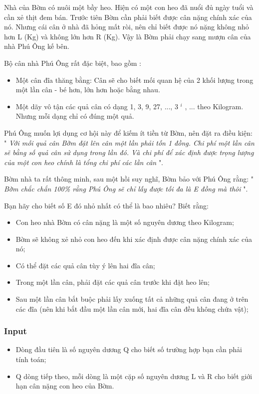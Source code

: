 



   Nhà của Bờm có nuôi một bầy heo. Hiện có một con heo đã nuổi đủ ngày tuổi và cần xẻ thịt đem bán. Trước tiên Bờm cần phải biết được cân nặng chính xác của nó. Nhưng cái cân ở nhà đã hỏng mất ròi, nên chỉ biết được nó nặng không nhỏ hơn L (Kg) và không lớn hơn R (Kg). Vậy là Bờm phải chạy sang mượn cân của nhà Phú Ông kế bên.  

   Bộ cân nhà Phú Ông rất đặc biệt, bao gồm :  
\begin{itemize}
	\item     Một cân đĩa thăng bằng: Cân sẽ cho biết mối quan hệ của 2 khối lượng trong một lần cân - bé hơn, lớn hơn hoặc bằng nhau.   
	\item     Một dãy vô tận các quả cân có dạng 1, 3, 9, 27, ..., 3    $^     i    $    , ... theo Kilogram. Nhưng mỗi dạng chỉ có đúng một quả.   
\end{itemize}

   Phú Ông muốn lợi dụng cơ hội này để kiếm ít tiền từ Bờm, nên đặt ra điều kiện: "   \emph{    Với mỗi quả cân Bờm đặt lên cân một lần phải tốn 1 đồng. Chi phí một lần cân sẽ bằng số quả cân sử dụng trong lần đó. Và chi phí để xác định được trọng lượng của một con heo chính là tổng chi phí các lần cân   }   ".  

   Bờm nhà ta rất thông minh, sau một hồi suy nghĩ, Bờm bảo với Phú Ông rằng: "   \emph{    Bờm chắc chắn 100\% rằng Phú Ông sẽ chỉ lấy được tối đa là E đồng mà thôi   }   ".  

   Bạn hãy cho biết số E đó nhỏ nhất có thể là bao nhiêu? Biết rằng:  
\begin{itemize}
	\item     Con heo nhà Bờm có cân nặng là một số nguyên dương theo Kilogram;   
	\item     Bờm sẽ không xẻ nhỏ con heo đến khi xác định được cân nặng chính xác của nó;   
	\item     Có thể đặt các quả cân tùy ý lên hai đĩa cân;   
	\item     Trong một lần cân, phải đặt các quả cân trước khi đặt heo lên;   
	\item     Sau một lần cân bắt buộc phải lấy xuống tất cả những quả cân đang ở trên  các đĩa (nên khi bắt đầu một lần cân mới, hai đĩa cân đều không chứa  vật);   
\end{itemize}

\subsubsection{   Input  }
\begin{itemize}
	\item     Dòng đầu tiên là số nguyên dương Q cho biết số trường hợp bạn cần phải tính toán;   
	\item     Q dòng tiếp theo, mỗi dòng là một cặp số nguyên dương L và R cho biết giới hạn cân nặng con heo của Bờm.   
\end{itemize}

